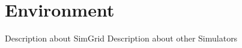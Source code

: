 \chapter{Environment}
\label{chapter:environment}
Description about SimGrid
Description about other Simulators
